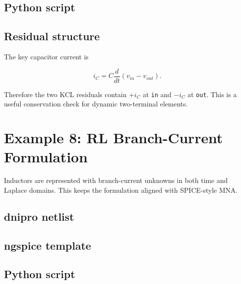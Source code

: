 \documentclass[11pt,a4paper]{article}
\newcommand{\code}[1]{\texttt{#1}}
\begin{document}


\subsection{Python script}



\subsection{Residual structure}

The key capacitor current is

\begin{equation}
    i_C = C\frac{d}{dt}\left(v_{in}-v_{out}\right).
\end{equation}

Therefore the two KCL residuals contain \(+i_C\) at \code{in} and \(-i_C\) at
\code{out}. This is a useful conservation check for dynamic two-terminal
elements.

\section{Example 8: RL Branch-Current Formulation}
\label{sec:ex-rl-branch-current}

Inductors are represented with branch-current unknowns in both time and Laplace
domains. This keeps the formulation aligned with SPICE-style MNA.

\subsection{dnipro netlist}



\subsection{ngspice template}



\subsection{Python script}
\end{document}

